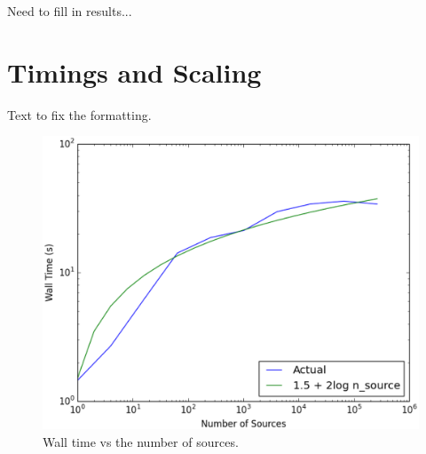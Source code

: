 Need to fill in results...


%

\section{Timings and Scaling}
\label{sec:timing}

Text to fix the formatting.

\begin{figure}
\includegraphics[width=\textwidth]{graphics/Timings.eps}
\caption[Wall time vs the number of sources.]{Wall time vs the number of sources.}
\label{fig:scaling}
\end{figure}


